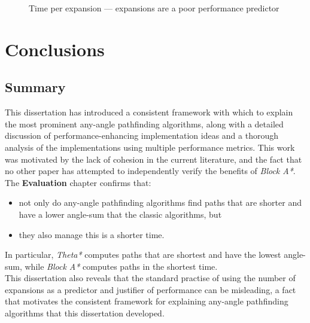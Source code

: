 \documentclass[12pt,notitlepage]{report}
\begin{document}
\begin{figure}
\centering

\caption[Time per expansion]{Time per expansion --- expansions are a poor performance predictor}
\end{figure}

\chapter{Conclusions}

\section{Summary}
This dissertation has introduced a consistent framework with which to explain the most prominent any-angle pathfinding algorithms, along with a detailed discussion of performance-enhancing implementation ideas and a thorough analysis of the implementations using multiple performance metrics. This work was motivated by the lack of cohesion in the current literature, and the fact that no other paper has attempted to independently verify the benefits of {\em Block A*}.\\

\noindent
The {\bfseries Evaluation} chapter confirms that:
\begin{itemize} 
\item not only do any-angle pathfinding algorithms find paths that are shorter and have a lower angle-sum that the classic algorithms, but 
\item they also manage this is a shorter time. 
\end{itemize}

\noindent
In particular, {\em Theta*} computes paths that are shortest and have the lowest angle-sum, while {\em Block A*} computes paths in the shortest time.\\

\noindent
This dissertation also reveals that the standard practise of using the number of expansions as a predictor and justifier of performance can be misleading, a fact that motivates the consistent framework for explaining any-angle pathfinding algorithms that this dissertation developed.
\end{document}
